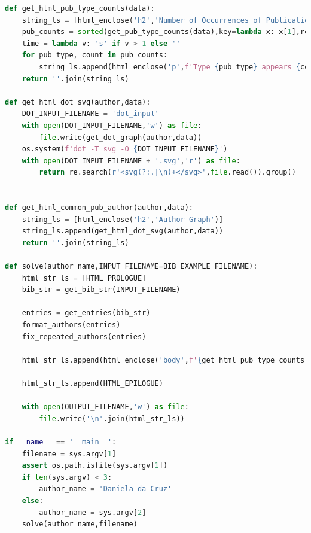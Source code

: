 \documentclass[11pt,a4paper]{report}
\begin{document}
\begin{appendices}
\begin{lstlisting}[language=python]
def get_html_pub_type_counts(data):
    string_ls = [html_enclose('h2','Number of Occurrences of Publication Types')]
    pub_counts = sorted(get_pub_type_counts(data),key=lambda x: x[1],reverse=True)
    time = lambda v: 's' if v > 1 else ''
    for pub_type, count in pub_counts:
        string_ls.append(html_enclose('p',f'Type {pub_type} appears {count} time{time(count)}'))
    return ''.join(string_ls)

def get_html_dot_svg(author,data):
    DOT_INPUT_FILENAME = 'dot_input'
    with open(DOT_INPUT_FILENAME,'w') as file:
        file.write(get_dot_graph(author,data))
    os.system(f'dot -T svg -O {DOT_INPUT_FILENAME}')
    with open(DOT_INPUT_FILENAME + '.svg','r') as file:
        return re.search(r'<svg(?:.|\n)+</svg>',file.read()).group()


def get_html_common_pub_author(author,data):
    string_ls = [html_enclose('h2','Author Graph')]
    string_ls.append(get_html_dot_svg(author,data))
    return ''.join(string_ls)

def solve(author_name,INPUT_FILENAME=BIB_EXAMPLE_FILENAME):
    html_str_ls = [HTML_PROLOGUE]
    bib_str = get_bib_str(INPUT_FILENAME)

    entries = get_entries(bib_str)
    format_authors(entries)
    fix_repeated_authors(entries)

    html_str_ls.append(html_enclose('body',f'{get_html_pub_type_counts(entries)}{get_html_common_pub_author(author_name,entries)}{get_html_pub_type_index(entries)}{get_html_author_index(entries)}'))

    html_str_ls.append(HTML_EPILOGUE)

    with open(OUTPUT_FILENAME,'w') as file:
        file.write('\n'.join(html_str_ls))

if __name__ == '__main__':
    filename = sys.argv[1]
    assert os.path.isfile(sys.argv[1])
    if len(sys.argv) < 3:
        author_name = 'Daniela da Cruz'
    else:
        author_name = sys.argv[2]
    solve(author_name,filename)
\end{lstlisting}
\end{appendices} 
\end{document}
